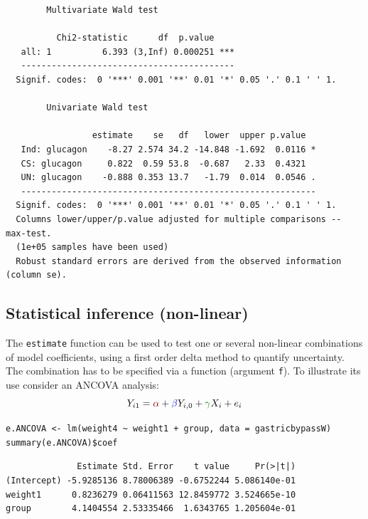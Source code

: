 \documentclass[12pt]{article}
\newcommand{\darkblue}{blue!80!black}
\newcommand{\darkgreen}{green!50!black}
\newcommand{\darkred}{red!50!black}
\begin{document}
\begin{verbatim}
		Multivariate Wald test 

          Chi2-statistic      df  p.value    
   all: 1          6.393 (3,Inf) 0.000251 ***
   ------------------------------------------ 
  Signif. codes:  0 '***' 0.001 '**' 0.01 '*' 0.05 '.' 0.1 ' ' 1.

		Univariate Wald test 

                 estimate    se   df   lower  upper p.value  
   Ind: glucagon    -8.27 2.574 34.2 -14.848 -1.692  0.0116 *
   CS: glucagon     0.822  0.59 53.8  -0.687   2.33  0.4321  
   UN: glucagon    -0.888 0.353 13.7   -1.79  0.014  0.0546 .
   ---------------------------------------------------------- 
  Signif. codes:  0 '***' 0.001 '**' 0.01 '*' 0.05 '.' 0.1 ' ' 1.
  Columns lower/upper/p.value adjusted for multiple comparisons -- max-test.
  (1e+05 samples have been used)
  Robust standard errors are derived from the observed information (column se).
\end{verbatim}

\clearpage

\subsection{Statistical inference (non-linear)}
\label{sec:org84f14c9}

The \texttt{estimate} function can be used to test one or several non-linear
combinations of model coefficients, using a first order delta method
to quantify uncertainty. The combination has to be specified via a
function (argument \texttt{f}). To illustrate its use consider an ANCOVA
analysis:
\[ Y_{i1} = \textcolor{\darkred}{\alpha} + \textcolor{\darkblue}{\beta} Y_{i,0} + \textcolor{\darkgreen}{\gamma} X_{i} + e_{i} \]

\lstset{language=r,label= ,caption= ,captionpos=b,numbers=none}
\begin{lstlisting}
e.ANCOVA <- lm(weight4 ~ weight1 + group, data = gastricbypassW)
summary(e.ANCOVA)$coef
\end{lstlisting}

\begin{verbatim}
              Estimate Std. Error    t value     Pr(>|t|)
(Intercept) -5.9285136 8.78006389 -0.6752244 5.086140e-01
weight1      0.8236279 0.06411563 12.8459772 3.524665e-10
group        4.1404554 2.53335466  1.6343765 1.205604e-01
\end{verbatim}
\end{document}
